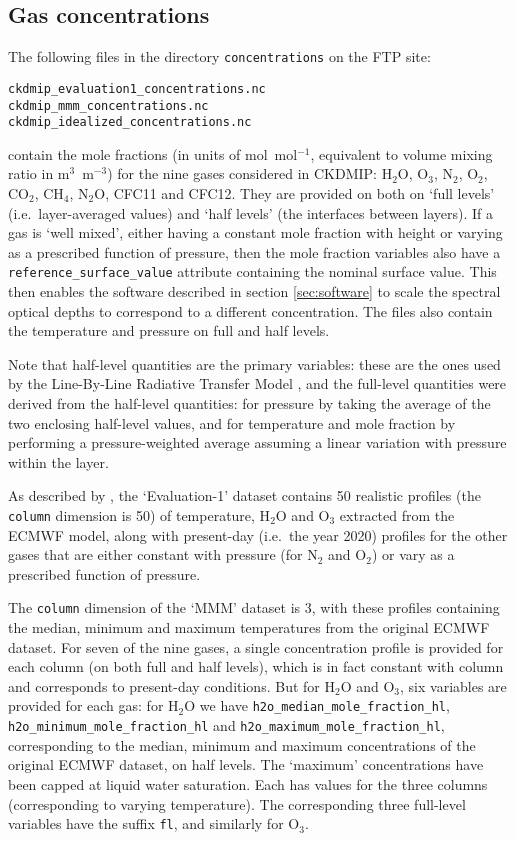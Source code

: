 \documentclass[twoside]{article}
\def\codesize{\small}
\def\code#1{{\codesize\texttt{#1}}}
\begin{document}
\subsection{Gas concentrations}
\label{sec:conc}
The following files in the directory \code{concentrations} on the FTP
site:
\begin{verbatim}
ckdmip_evaluation1_concentrations.nc
ckdmip_mmm_concentrations.nc
ckdmip_idealized_concentrations.nc
\end{verbatim}
contain the mole fractions (in units of mol~mol$^{-1}$, equivalent to
volume mixing ratio in m$^3$~m$^{-3}$) for the nine gases considered
in CKDMIP: H$_2$O, O$_3$, N$_2$, O$_2$, CO$_2$, CH$_4$, N$_2$O, CFC11
and CFC12.  They are provided on both on `full levels'
(i.e.\ layer-averaged values) and `half levels' (the interfaces
between layers).  If a gas is `well mixed', either having a constant
mole fraction with height or varying as a prescribed function of
pressure, then the mole fraction variables also have a
\code{reference\_surface\_value} attribute containing the nominal
surface value. This then enables the software described in section
\ref{sec:software} to scale the spectral optical depths to correspond
to a different concentration. The files also contain the temperature
and pressure on full and half levels.

Note that half-level quantities are the primary variables: these are
the ones used by the Line-By-Line Radiative Transfer Model
\cite[LBLRTM;][]{Clough+2005}, and the full-level quantities were
derived from the half-level quantities: for pressure by taking the
average of the two enclosing half-level values, and for temperature
and mole fraction by performing a pressure-weighted average assuming a
linear variation with pressure within the layer.

As described by \cite{Hogan+2020}, the `Evaluation-1' dataset contains
50 realistic profiles (the \code{column} dimension is 50) of
temperature, H$_2$O and O$_3$ extracted from the ECMWF model, along
with present-day (i.e.\ the year 2020) profiles for the other gases
that are either constant with pressure (for N$_2$ and O$_2$) or vary
as a prescribed function of pressure.

The \code{column} dimension of the `MMM' dataset is 3, with these
profiles containing the median, minimum and maximum temperatures from
the original ECMWF dataset. For seven of the nine gases, a single
concentration profile is provided for each column (on both full and
half levels), which is in fact constant with column and corresponds to
present-day conditions.  But for H$_2$O and O$_3$, six variables
are provided for each gas: for H$_2$O we have
\code{h2o\_median\_mole\_fraction\_hl},
\code{h2o\_minimum\_mole\_fraction\_hl} and
\code{h2o\_maximum\_mole\_fraction\_hl}, corresponding to the
median, minimum and maximum concentrations of the original ECMWF
dataset, on half levels. The `maximum' concentrations have been capped
at liquid water saturation.  Each has values for the three columns
(corresponding to varying temperature).  The corresponding three
full-level variables have the suffix \code{fl}, and similarly for
O$_3$.
\end{document}
